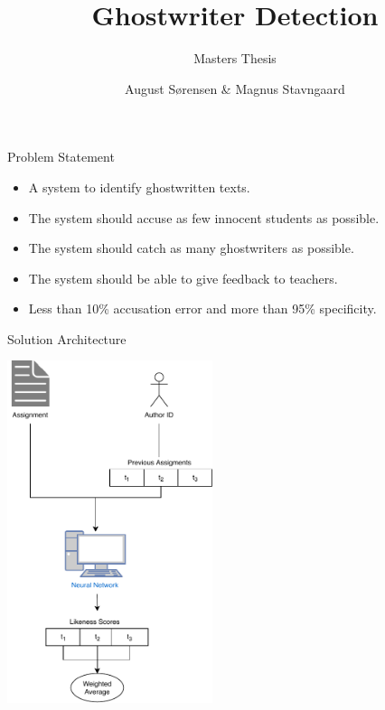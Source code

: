 \documentclass[10pt]{beamer}
\title{Ghostwriter Detection}
\subtitle{Masters Thesis}
\date{}
\author{August S\o rensen \& Magnus Stavngaard}
\institute{University of Copenhagen}
\begin{document}
\maketitle

\begin{frame}[fragile]{Problem Statement}
    \begin{itemize}
        \item A system to identify ghostwritten texts.
        \item The system should accuse as few innocent students as possible.
        \item The system should catch as many ghostwriters as possible.
        \item The system should be able to give feedback to teachers.
        \item Less than 10\% accusation error and more than 95\% specificity.
    \end{itemize}
\end{frame}

\begin{frame}[fragile]{Solution Architecture}
    \begin{center}
        \includegraphics[width=0.45\textwidth]{../../macom/summary/pictures/Model}
    \end{center}
\end{frame}
\end{document}
